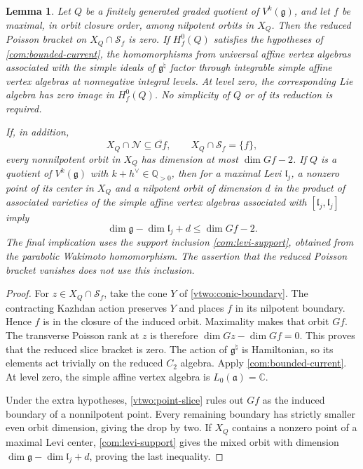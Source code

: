 \documentclass[11pt,a4paper]{amsart}
\numberwithin{equation}{section}
\newtheorem{lemma}[theorem]{Lemma}
\theoremstyle{definition}
\theoremstyle{remark}
\newcommand{\C}{\mathbb C}
\newcommand{\Q}{\mathbb Q}
\newcommand{\g}{\mathfrak g}
\newcommand{\lev}{\mathfrak l}
\newcommand{\N}{\mathcal N}
\begin{document}
\begin{lemma}\label{com:maximal-boundary}
Let $Q$ be a finitely generated graded quotient of $V^k(\g)$, and let $f$
be maximal, in orbit closure order, among nilpotent orbits in $X_Q$.
Then the reduced Poisson bracket on $X_Q\cap\mathcal S_f$ is zero.
If $H_f^0(Q)$ satisfies the hypotheses of \cref{com:bounded-current},
the homomorphisms from universal affine vertex algebras associated with
the simple ideals of $\g^\natural$ factor through integrable simple
affine vertex algebras at nonnegative integral levels. At level zero,
the corresponding Lie algebra has zero image in $H_f^0(Q)$. No simplicity of $Q$ or of its reduction is required.

If, in addition,
$$
 X_Q\cap\N\subseteq\overline{Gf},\qquad
 X_Q\cap\mathcal S_f=\{f\},
$$
every nonnilpotent orbit in $X_Q$ has dimension at most $\dim Gf-2$.
If $Q$ is a quotient of $V^k(\g)$ with $k+h^\vee\in\Q_{>0}$, then for a maximal Levi $\lev_j$, a nonzero point of its center in $X_Q$ and a nilpotent
orbit of dimension $d$ in the product of associated varieties of the simple affine vertex
algebras associated with $[\lev_j,\lev_j]$ imply
\begin{equation}\label{com:center-dimension-test}
 \dim\g-\dim\lev_j+d\le\dim Gf-2.
\end{equation}
The final implication uses the support inclusion \cref{com:levi-support},
obtained from the parabolic Wakimoto homomorphism. The assertion that
the reduced Poisson bracket vanishes does not use this inclusion.
\end{lemma}
\begin{proof}
For $z\in X_Q\cap\mathcal S_f$, take the cone $Y$ of
\cref{vtwo:conic-boundary}. The contracting Kazhdan action preserves
$Y$ and places $f$ in its nilpotent boundary. Hence $f$ is in the
closure of the induced orbit. Maximality makes that orbit $Gf$.
The transverse Poisson rank at $z$ is therefore
$\dim Gz-\dim Gf=0$. This proves that the reduced slice bracket is
zero. The action of $\g^\natural$ is Hamiltonian, so its elements
act trivially on the reduced $C_2$ algebra. Apply
\cref{com:bounded-current}. At level zero, the simple affine vertex algebra is
$L_0(\mathfrak a)=\C$.

Under the extra hypotheses, \cref{vtwo:point-slice} rules out $Gf$
as the induced boundary of a nonnilpotent point. Every remaining
boundary has strictly smaller even orbit dimension, giving the drop
by two. If $X_Q$ contains a nonzero point of a maximal Levi center, \cref{com:levi-support}
gives the mixed orbit with dimension
$\dim\g-\dim\lev_j+d$, proving the last inequality.
\end{proof}
\end{document}
